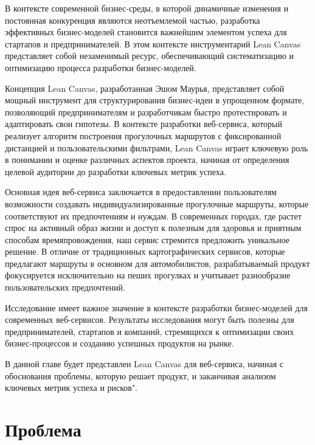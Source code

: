В контексте современной бизнес-среды, в которой динамичные изменения и постоянная конкуренция являются неотъемлемой частью, разработка эффективных бизнес-моделей становится важнейшим элементом успеха для стартапов и предпринимателей. В этом контексте инструментарий Lean Canvas представляет собой незаменимый ресурс, обеспечивающий систематизацию и оптимизацию процесса разработки бизнес-моделей.


Концепция Lean Canvas, разработанная Эшом Маурья, представляет собой мощный инструмент для структурирования бизнес-идеи в упрощенном формате, позволяющий предпринимателям и разработчикам быстро протестировать и адаптировать свои гипотезы. В контексте разработки веб-сервиса, который реализует алгоритм построения прогулочных маршрутов с фиксированной дистанцией и пользовательскими фильтрами, Lean Canvas играет ключевую роль в понимании и оценке различных аспектов проекта, начиная от определения целевой аудитории до разработки ключевых метрик успеха.


Основная идея веб-сервиса заключается в предоставлении пользователям возможности создавать индивидуализированные прогулочные маршруты, которые соответствуют их предпочтениям и нуждам. В современных городах, где растет спрос на активный образ жизни и доступ к полезным для здоровья и приятным способам времяпровождения, наш сервис стремится предложить уникальное решение. В отличие от традиционных картографических сервисов, которые предлагают маршруты в основном для автомобилистов, разрабатываемый продукт фокусируется исключительно на пеших прогулках и учитывает разнообразие пользовательских предпочтений.


Исследование имеет важное значение в контексте разработки бизнес-моделей для современных веб-сервисов. Результаты исследования могут быть полезны для предпринимателей, стартапов и компаний, стремящихся к оптимизации своих бизнес-процессов и созданию успешных продуктов на рынке.


В данной главе будет представлен Lean Canvas для веб-сервиса, начиная с обоснования проблемы, которую решает продукт, и заканчивая анализом ключевых метрик успеха и рисков".

\section{Проблема}

